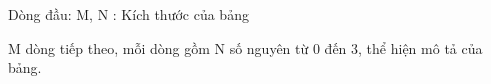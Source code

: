 Dòng đầu: M, N : Kích thước của bảng

M dòng tiếp theo, mỗi dòng gồm N số nguyên từ 0 đến 3, thể hiện mô tả của bảng.